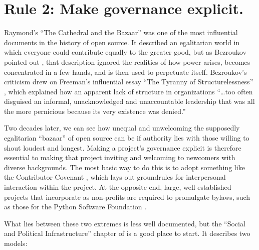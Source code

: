 \documentclass[10pt,letterpaper]{article}
\newcommand{\rulemajor}[1]{\section{#1}}
\begin{document}
\rulemajor{Rule 2: Make governance explicit.}

Raymond's ``The Cathedral and the Bazaar'' \cite{raymond2001}
was one of the most influential documents in the history of open source.
It described an egalitarian world in which everyone could contribute equally to the greater good,
but as Bezroukov pointed out \cite{bezroukov1999},
that description ignored the realities of how power arises,
becomes concentrated in a few hands,
and is then used to perpetuate itself.
Bezroukov's criticism drew on Freeman's influential essay ``The Tyranny of Structurelessness'' \cite{freeman1972},
which explained how an apparent lack of structure in organizations ``{\ldots}too often disguised an informal,
unacknowledged and unaccountable leadership that was all the more pernicious because its very existence was denied.''

Two decades later,
we can see how unequal and unwelcoming the supposedly egalitarian ``bazaar'' of open source can be
if authority lies with those willing to shout loudest and longest.
Making a project's governance explicit is therefore essential to making that project inviting and welcoming to newcomers with diverse backgrounds.
The most basic way to do this is to adopt something like the Contributor Covenant \cite{covenant},
which lays out groundrules for interpersonal interaction within the project.
At the opposite end,
large, well-established projects that incorporate as non-profits are required to promulgate bylaws,
such as those for the Python Software Foundation \cite{psf-bylaws}.

What lies between these two extremes is less well documented,
but the ``Social and Political Infrastructure'' chapter of \cite{fogel2005} is a good place to start.
It describes two models:
\end{document}

